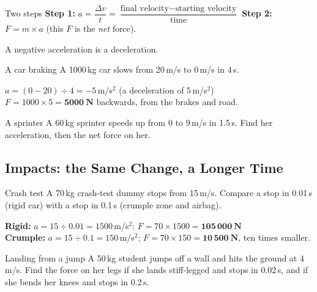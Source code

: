 \begin{skillbox}{Two steps}
\textbf{Step 1:} \quad $a = \dfrac{\Delta v}{t} = \dfrac{\text{final velocity} - \text{starting velocity}}{\text{time}}$ \qquad \textbf{Step 2:} \quad $F = m \times a$ \quad (this $F$ is the \emph{net} force).

A negative acceleration is a deceleration.
\end{skillbox}

\begin{workedex}{A car braking}
A 1000\,kg car slows from 20\,m/s to 0\,m/s in 4\,s.

\smallskip
$a = (0 - 20) \div 4 = -5$\,m/s$^2$ \quad (a deceleration of 5\,m/s$^2$)\\
$F = 1000 \times 5 = \mathbf{5000\ \text{N}}$ backwards, from the brakes and road.
\end{workedex}

\begin{wedo}{A sprinter}
A 60\,kg sprinter speeds up from 0 to 9\,m/s in 1.5\,s. Find her acceleration, then the net force on her.
\end{wedo}

\subsection{Impacts: the Same Change, a Longer Time}\label{sub:a4.2}

\begin{workedex}{Crash test}
A 70\,kg crash-test dummy stops from 15\,m/s. Compare a stop in 0.01\,s (rigid car) with a stop in 0.1\,s (crumple zone and airbag).

\smallskip
\textbf{Rigid:} $a = 15 \div 0.01 = 1500$\,m/s$^2$; $F = 70 \times 1500 = \mathbf{105\,000\ \text{N}}$\\
\textbf{Crumple:} $a = 15 \div 0.1 = 150$\,m/s$^2$; $F = 70 \times 150 = \mathbf{10\,500\ \text{N}}$, ten times smaller.
\end{workedex}

\begin{wedo}{Landing from a jump}
A 50\,kg student jumps off a wall and hits the ground at 4\,m/s. Find the force on her legs if she lands stiff-legged and stops in 0.02\,s, and if she bends her knees and stops in 0.2\,s.
\end{wedo}

\label{prac:4}


